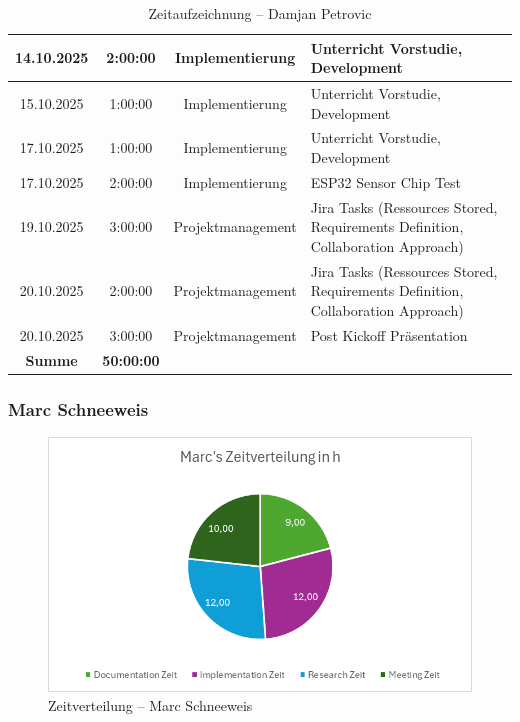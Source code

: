 \documentclass{article}
\begin{document}
\begin{table}[H]
\begin{tabularx}{\textwidth}{|c|c|c|X|}
    14.10.2025 & 2:00:00 & Implementierung   & Unterricht Vorstudie, Development \\ \hline
    15.10.2025 & 1:00:00 & Implementierung   & Unterricht Vorstudie, Development \\ \hline
    17.10.2025 & 1:00:00 & Implementierung   & Unterricht Vorstudie, Development \\ \hline
    17.10.2025 & 2:00:00 & Implementierung   & ESP32 Sensor Chip Test \\ \hline
    19.10.2025 & 3:00:00 & Projektmanagement & Jira Tasks (Ressources Stored, Requirements Definition, Collaboration Approach) \\ \hline
    20.10.2025 & 2:00:00 & Projektmanagement & Jira Tasks (Ressources Stored, Requirements Definition, Collaboration Approach) \\ \hline
    20.10.2025 & 3:00:00 & Projektmanagement & Post Kickoff Präsentation \\ \hline
    \rowcolor{black!10}\textbf{Summe} & \textbf{50:00:00} & & \\ \hline
  \end{tabularx}
  \caption{Zeitaufzeichnung – Damjan Petrovic}
  \label{tab:zeit-damjan}
\end{table}


\subsubsection*{Marc Schneeweis}

\begin{figure}[H]
  \centering
  \includegraphics[width=\textwidth]{Marc_Zeitverteilung.png}
  \caption{Zeitverteilung – Marc Schneeweis}
  \label{fig:marc-zeitverteilung}
\end{figure}
\end{document}
